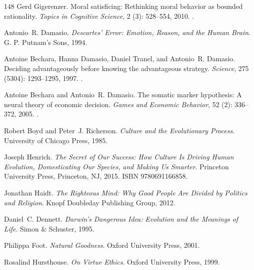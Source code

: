 \documentclass[11pt]{article}
\theoremstyle{plain}
\theoremstyle{definition}
\theoremstyle{remark}
\begin{document}
\begin{thebibliography}{148}
Gerd Gigerenzer.
\newblock Moral satisficing: Rethinking moral behavior as bounded rationality.
\newblock \emph{Topics in Cognitive Science}, 2 (3):
  528--554, 2010.
\newblock {}.

Antonio~R. Damasio.
\newblock \emph{Descartes' Error: Emotion, Reason, and the Human Brain}.
\newblock G. P. Putnam's Sons, 1994.

Antoine Bechara, Hanna Damasio, Daniel Tranel, and Antonio~R. Damasio.
\newblock Deciding advantageously before knowing the advantageous strategy.
\newblock \emph{Science}, 275 (5304): 1293--1295, 1997.
\newblock {}.

Antoine Bechara and Antonio~R. Damasio.
\newblock The somatic marker hypothesis: A neural theory of economic decision.
\newblock \emph{Games and Economic Behavior}, 52 (2):
  336--372, 2005.
\newblock {}.

Robert Boyd and Peter~J. Richerson.
\newblock \emph{Culture and the Evolutionary Process}.
\newblock University of Chicago Press, 1985.

Joseph Henrich.
\newblock \emph{The Secret of Our Success: How Culture Is Driving Human
  Evolution, Domesticating Our Species, and Making Us Smarter}.
\newblock Princeton University Press, Princeton, NJ, 2015.
\newblock ISBN 9780691166858.

Jonathan Haidt.
\newblock \emph{The Righteous Mind: Why Good People Are Divided by Politics and
  Religion}.
\newblock Knopf Doubleday Publishing Group, 2012.

Daniel~C. Dennett.
\newblock \emph{Darwin's Dangerous Idea: Evolution and the Meanings of Life}.
\newblock Simon \& Schuster, 1995.

Philippa Foot.
\newblock \emph{Natural Goodness}.
\newblock Oxford University Press, 2001.

Rosalind Hursthouse.
\newblock \emph{On Virtue Ethics}.
\newblock Oxford University Press, 1999.


\end{thebibliography}
\end{document}
